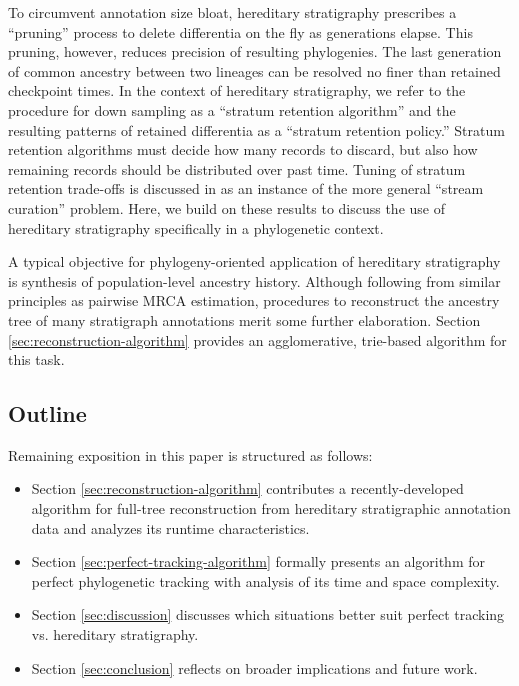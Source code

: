 To circumvent annotation size bloat, hereditary stratigraphy prescribes a ``pruning'' process to delete differentia on the fly as generations elapse.
This pruning, however, reduces precision of resulting phylogenies.
The last generation of common ancestry between two lineages can be resolved no finer than retained checkpoint times.
In the context of hereditary stratigraphy, we refer to the procedure for down sampling as a ``stratum retention algorithm'' and the resulting patterns of retained differentia as a ``stratum retention policy.''
Stratum retention algorithms must decide how many records to discard, but also how remaining records should be distributed over past time.
Tuning of stratum retention trade-offs is discussed in \citet{moreno2024algorithms} as an instance of the more general ``stream curation'' problem.
Here, we build on these results to discuss the use of hereditary stratigraphy specifically in a phylogenetic context.

A typical objective for phylogeny-oriented application of hereditary stratigraphy is synthesis of population-level ancestry history.
Although following from similar principles as pairwise MRCA estimation, procedures to reconstruct the ancestry tree of many stratigraph annotations merit some further elaboration.
Section \ref{sec:reconstruction-algorithm} provides an agglomerative, trie-based algorithm for this task.



\subsection{Outline}

Remaining exposition in this paper is structured as follows:
\begin{itemize}
\item Section \ref{sec:reconstruction-algorithm} contributes a recently-developed algorithm for full-tree reconstruction from hereditary stratigraphic annotation data and analyzes its runtime characteristics.
\item Section \ref{sec:perfect-tracking-algorithm} formally presents an algorithm for perfect phylogenetic tracking with analysis of its time and space complexity.
\item Section \ref{sec:discussion} discusses which situations better suit perfect tracking vs. hereditary stratigraphy.
\item Section \ref{sec:conclusion} reflects on broader implications and future work.
\end{itemize}

